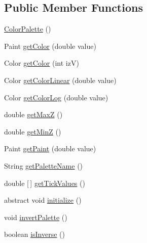 \subsection*{Public Member Functions}
\begin{DoxyCompactItemize}
\item 
\mbox{\hyperlink{classorg_1_1jfree_1_1chart_1_1plot_1_1_color_palette_af08d4aac933445b2b380d14d3bbd22f9}{Color\+Palette}} ()
\item 
Paint \mbox{\hyperlink{classorg_1_1jfree_1_1chart_1_1plot_1_1_color_palette_a9e5b5b2da2058672c706f55039f8cd2d}{get\+Color}} (double value)
\item 
Color \mbox{\hyperlink{classorg_1_1jfree_1_1chart_1_1plot_1_1_color_palette_ab4ad5bb21ee921ff3daa9b0ccc89a116}{get\+Color}} (int izV)
\item 
Color \mbox{\hyperlink{classorg_1_1jfree_1_1chart_1_1plot_1_1_color_palette_a68be890282cd0bc87116003226285374}{get\+Color\+Linear}} (double value)
\item 
Color \mbox{\hyperlink{classorg_1_1jfree_1_1chart_1_1plot_1_1_color_palette_a98fd609fb10d838212f14a6d042c951f}{get\+Color\+Log}} (double value)
\item 
double \mbox{\hyperlink{classorg_1_1jfree_1_1chart_1_1plot_1_1_color_palette_aa740b4cd9a115ff7bdefdaa74521c6de}{get\+MaxZ}} ()
\item 
double \mbox{\hyperlink{classorg_1_1jfree_1_1chart_1_1plot_1_1_color_palette_a00ea2c2fc54cc8049467c66b14647741}{get\+MinZ}} ()
\item 
Paint \mbox{\hyperlink{classorg_1_1jfree_1_1chart_1_1plot_1_1_color_palette_a7d4758d9e1df336cb3e6a31ff2a4e920}{get\+Paint}} (double value)
\item 
String \mbox{\hyperlink{classorg_1_1jfree_1_1chart_1_1plot_1_1_color_palette_aca84890abf082714dc821ac9d094bd34}{get\+Palette\+Name}} ()
\item 
double \mbox{[}$\,$\mbox{]} \mbox{\hyperlink{classorg_1_1jfree_1_1chart_1_1plot_1_1_color_palette_aa8c19edc94fc1d0d1dd0c40081e52eb1}{get\+Tick\+Values}} ()
\item 
abstract void \mbox{\hyperlink{classorg_1_1jfree_1_1chart_1_1plot_1_1_color_palette_a029bd8772bbc7b44c3617c0024769521}{initialize}} ()
\item 
void \mbox{\hyperlink{classorg_1_1jfree_1_1chart_1_1plot_1_1_color_palette_a757b17cf3b3ec92ead270f5d21111b6b}{invert\+Palette}} ()
\item 
boolean \mbox{\hyperlink{classorg_1_1jfree_1_1chart_1_1plot_1_1_color_palette_a9d42a753732d178554e25f24761d8199}{is\+Inverse}} ()

\end{DoxyCompactItemize}
